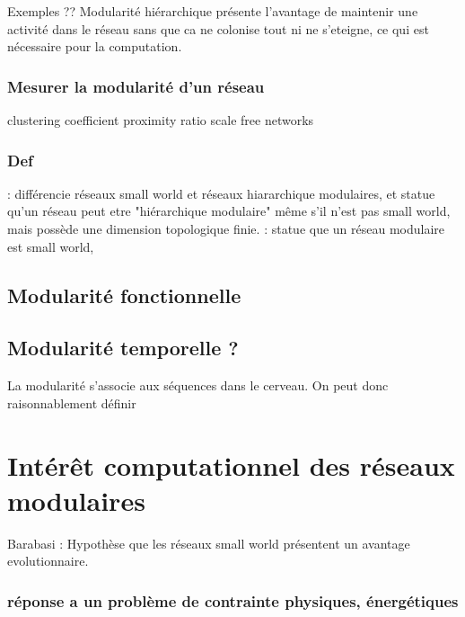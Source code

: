 Exemples ?? \cite{Meunier2010ModularAH}
Modularité hiérarchique présente l'avantage de maintenir une activité dans le réseau sans que ca ne colonise tout ni ne s'eteigne, ce qui est nécessaire pour la computation. 

\subsubsection{Mesurer la modularité d'un réseau}
clustering coefficient
proximity ratio
scale free networks

\subsubsection{Def}
\cite{Hilgetag2015IsTB} : différencie réseaux small world et réseaux hiararchique modulaires, et statue qu'un réseau peut etre "hiérarchique modulaire" même s'il n'est pas small world, mais possède une dimension topologique finie. 
\cite{Meunier2010ModularAH} : statue que un réseau modulaire est small world,

\subsection{Modularité fonctionnelle}


\subsection{Modularité temporelle ?}

La modularité s'associe aux séquences dans le cerveau. On peut donc raisonnablement définir 

\section{Intérêt computationnel des réseaux modulaires}

Barabasi : Hypothèse que les réseaux small world présentent un avantage evolutionnaire.

\subsubsection{réponse a un problème de contrainte physiques, énergétiques}

